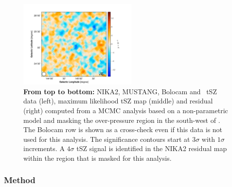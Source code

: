\documentclass[traditabstract]{aa}
\begin{document}
\begin{figure}[h!]
\includegraphics[height=4.4cm]{Paper_Planck_Residual.pdf}
\caption{{\footnotesize \textbf{From top to bottom:} NIKA2, MUSTANG, Bolocam and \planck\ tSZ data (left), maximum likelihood tSZ map (middle) and residual (right) computed from a MCMC analysis based on a non-parametric model and masking the over-pressure region in the south-west of \psz. The Bolocam row is shown as a cross-check even if this data is not used for this analysis. The significance contours start at $3\sigma$ with $1\sigma$ increments. A $4\sigma$ tSZ signal is identified in the NIKA2 residual map within the region that is masked for this analysis.}}
\label{fig:NIKA2_Data_fit_residual}
\end{figure}

\subsubsection{Method}\label{sec:MCMC_method}
\end{document}

